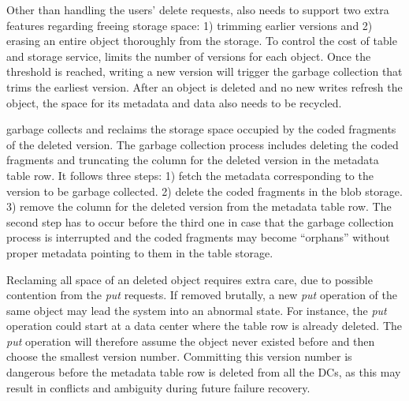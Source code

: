 Other than handling the users' delete requests, \name also needs to support two
extra features regarding freeing storage space: 1) trimming earlier versions and
2) erasing an entire object thoroughly from the storage. To control the cost of
table and storage service, \name limits the number of versions for each object.
Once the threshold is reached, writing a new version will trigger the garbage
collection that trims the earliest version. After an object is deleted and no
new writes refresh the object, the space for its metadata and data also needs to
be recycled.


\name garbage collects and reclaims the storage space occupied by the coded
fragments of the deleted version.  The garbage collection process includes
deleting the coded fragments and truncating the column for the deleted version
in the metadata table row. It follows three steps: 1) fetch the metadata
corresponding to the version to be garbage collected. 2) delete the coded
fragments in the blob storage. 3) remove the column for the deleted version from
the metadata table row. The second step has to occur before the third one in
case that the garbage collection process is interrupted and the coded fragments
may become ``orphans'' without proper metadata pointing to them in the table
storage.

Reclaming all space of an deleted object requires extra care, due to possible
contention from the \emph{put} requests. If removed brutally, a new {\em put}
operation of the same object may lead the system into an abnormal state. For
instance, the {\em put} operation could start at a data center where the table
row is already deleted. The {\em put} operation will therefore assume the object
never existed before and then choose the smallest version number. Committing
this version number is dangerous before the metadata table row is deleted from
all the DCs, as this may result in conflicts and ambiguity during future failure
recovery.

